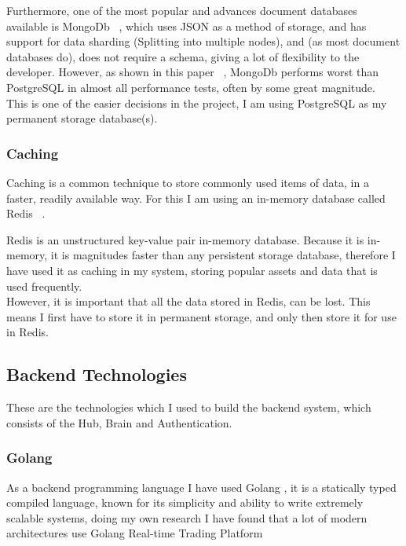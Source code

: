 \documentclass[titlepage]{article}
\begin{document}
Furthermore, one of the most popular and advances document databases available is MongoDb ~\cite{mongodb}, which uses JSON as a method of storage, and has support for data sharding (Splitting into multiple nodes), and (as most document databases do), does not require a schema, giving a lot of flexibility to the developer. However, as shown in this paper ~\cite{mongo_vs_postgres}, MongoDb performs worst than PostgreSQL in almost all performance tests, often by some great magnitude. \\

This is one of the easier decisions in the project, I am using PostgreSQL as my permanent storage database(s).

\subsubsection{Caching}
Caching is a common technique to store commonly used items of data, in a faster, readily available way. For this I am using an in-memory database called Redis ~\cite{redis}.

Redis is an unstructured key-value pair in-memory database. Because it is in-memory, it is magnitudes faster than any persistent storage database, therefore I have used it as caching in my system, storing popular assets and data that is used frequently. \\
However, it is important that all the data stored in Redis, can be lost. This means I first have to store it in permanent storage, and only then store it for use in Redis. \\

\subsection{Backend Technologies}
These are the technologies which I used to build the backend system, which consists of the Hub, Brain and Authentication. \\

\subsubsection{Golang}
As a backend programming language I have used Golang , it is a statically typed compiled language, known for its simplicity and ability to write extremely scalable systems, doing my own research I have found that a lot of modern architectures use Golang Real-time Trading Platform \\
\end{document}
